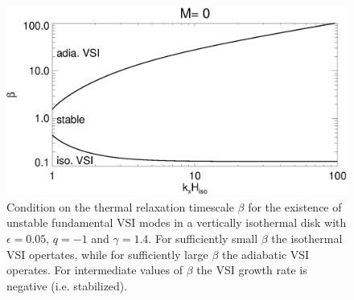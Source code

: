 \begin{figure}
  \includegraphics[width=\linewidth]{figures/bcrit_theory}
  \caption{Condition on the thermal relaxation timescale $\beta$ for the existence of unstable fundamental VSI
    modes in a vertically isothermal disk with $\epsilon=0.05$, $q=-1$
    and $\gamma=1.4$. For sufficiently small $\beta$ the isothermal VSI opertates,
    while for sufficiently large $\beta$ the adiabatic VSI
    operates. For intermediate values of $\beta$ the VSI growth rate
    is negative (i.e. stabilized). 
    \label{relax_bcrit}}  
\end{figure}   




















